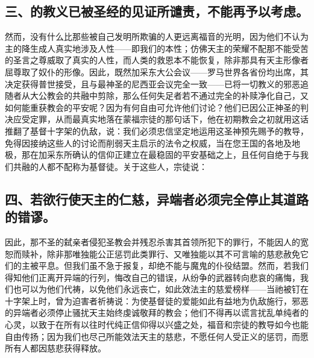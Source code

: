 
\subsection{三、的教义已被圣经的见证所谴责，不能再予以考虑。}

然而，没有什么比那些被自己发明所欺骗的人更远离福音的光明，因为他们不认为主的降生成人真实地涉及人性——即我们的本性；仿佛天主的荣耀不配那不能受苦的圣言之尊威取了真实的人性，而人类的救恩本不能恢复，除非那具有天主形像者屈尊取了奴仆的形像。因此，既然加采东大公会议——罗马世界各省份均出席，其决定获得普世接受，且与最神圣的尼西亚会议完全一致——已将一切教义的邪恶追随者从大公教会的共融中剪除，那么任何失足者若不通过完全的补赎净化自己，又如何能重获教会的平安呢？因为有何自由可允许他们讨论？他们已因公正神圣的判决应受定罪，从而最真实地落在蒙福宗徒的那句话下，他在初期教会之初就用这话推翻了基督十字架的仇敌，说：我们必须忠信坚定地运用这圣神预先赐予的教导，免得因接纳这些人的讨论而削弱天主启示的法令之权威，当在您王国的各地及地极，那在加采东所确认的信仰正建立在最稳固的平安基础之上，且任何自绝于与我们共融的人都不配称为基督徒。关于这些人，宗徒说：\par


\subsection{四、若欲行使天主的仁慈，异端者必须完全停止其道路的错谬。}

因此，那不圣的弑亲者侵犯圣教会并残忍杀害其首领所犯下的罪行，不能因人的宽恕而赎补，除非那唯独能公正惩罚此类罪行、又唯独能以其不可言喻的慈悲赦免它们的主被平息。但我们虽不急于报复，却绝不能与魔鬼的仆役结盟。然而，若我们得知他们正离开异端的行列，悔改自己的错误，从纷争的武器转向悲哀的痛悔，我们也可以为他们代祷，以免他们永远丧亡，如此效法主的慈爱榜样——当祂被钉在十字架上时，曾为迫害者祈祷说：为使基督徒的爱能如此有益地为仇敌施行，邪恶的异端者必须停止骚扰天主始终虔诚敬拜的教会；他们不得再以谎言扰乱单纯者的心灵，以致于在所有以往时代纯正信仰得以兴盛之处，福音和宗徒的教导如今也能自由传扬；因为我们也尽己所能效法天主的慈悲，不愿任何人受正义的惩罚，而愿所有人都因慈悲获得释放。\par

